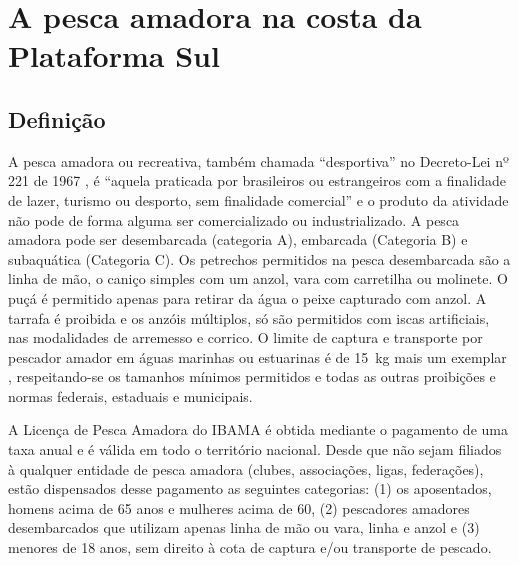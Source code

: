 \documentclass[a4paper,11pt,twoside,showtrims,onecolumn,openright,final]{memoir}
\begin{document}


\chapter{A pesca amadora na costa da Plataforma Sul}\label{chap:pesca-amadora}




\newpage

\section*{Definição}

A pesca amadora ou recreativa, também chamada ``desportiva'' no Decreto-Lei nº 221 de 1967 \citep{brasil1967}, 
é ``aquela praticada por brasileiros ou estrangeiros com a finalidade de lazer, turismo ou 
desporto, sem finalidade comercial'' e o produto da atividade não pode de forma alguma ser 
comercializado ou industrializado. A pesca amadora pode ser desembarcada (categoria A), 
embarcada (Categoria B) e subaquática (Categoria C). Os petrechos permitidos na pesca 
desembarcada são a linha de mão, o caniço simples com um anzol, vara com carretilha ou 
molinete. O puçá é permitido apenas para retirar da água o peixe capturado com anzol. A tarrafa 
é proibida e os anzóis múltiplos, só são permitidos com iscas artificiais, nas modalidades 
de arremesso e corrico. O limite de captura e transporte por pescador amador em águas marinhas 
ou estuarinas é de 15~kg mais um exemplar \citep{ibama2003a,ibama2003b}, respeitando-se os 
tamanhos mínimos permitidos \citep{ibama2003c}
e todas as outras proibições e normas federais, estaduais e municipais. 

A Licença de Pesca Amadora do IBAMA é obtida mediante o pagamento de uma taxa anual e é 
válida em todo o território nacional. Desde que não sejam filiados à qualquer entidade de 
pesca amadora (clubes, associações, ligas, federações), estão dispensados desse pagamento 
as seguintes categorias: 
(1) os aposentados, homens acima de 65 anos e mulheres acima de 60, 
(2) pescadores amadores desembarcados que utilizam apenas linha de mão ou vara, linha e anzol e 
(3) menores de 18 anos, sem direito à cota de captura e/ou transporte de pescado. 
\end{document}
